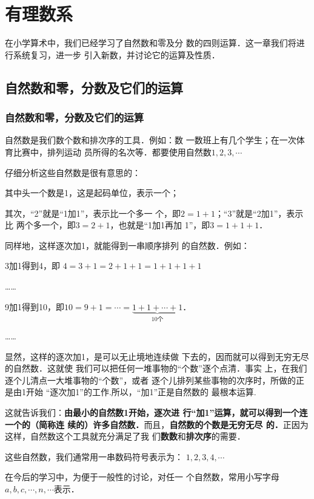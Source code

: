 \chapter{有理数系}

    在小学算术中，我们已经学习了自然数和零及分
数的四则运算．这一章我们将进行系统复习，进一步
引入新数，并讨论它的运算及性质．

\section{自然数和零，分数及它们的运算}

\subsection{自然数和零，分数及它们的运算}

自然数是我们数个数和排次序的工具．例如：数
一数班上有几个学生；在一次体育比赛中，排列运动
员所得的名次等．都要使用自然数$1,  2,  3,\cdots$

    仔细分析这些自然数是很有意思的：
    
    其中头一个数是1，这是起码单位，表示一个；

    其次，“2”就是“1加1”，表示比一个多一
个，即$2=1+1$；“3”就是“2加1”，表示比
两个多一个，即$3=2+1$，也就是“1加1再加
1”，即$3=1+1+1$．

    同样地，这样逐次加1，就能得到一串顺序排列
的自然数．例如：  

3加1得到4，即
$4=3+1=2+1+1=1+1+1+1$

……

9加1得到10，即$10= 9+1=\cdots=\underbrace{1+1+\cdots+1}_{10\text{个}}$．

……

显然，这样的逐次加1，是可以无止境地连续做
下去的，因而就可以得到无穷无尽的自然数．这就使
我们可以把任何一堆事物的“个数”逐个点清．事实
上，在我们逐个儿清点一大堆事物的“个数”，或者
逐个儿排列某些事物的次序时，所做的正是由1开始
“逐次加1”的工作.所以，“加1”正是自然数的
最根本运算.

    这就告诉我们：\textbf{由最小的自然数1开始，逐次进
行“加1”运算，就可以得到一个连一个的（简称连
续的）许多自然数．}而且，\textbf{自然数的个数是无穷无尽
的．}正因为这样，自然数这个工具就充分满足了我
们\textbf{数数}和\textbf{排次序}的需要．

这些自然数，我们通常用一串数码符号表示为：
$1,2,3,4,\cdots$

在今后的学习中，为便于一般性的讨论，对任一
个自然数，常用小写字母$a,b,c,\cdots,n,\cdots$表示．

